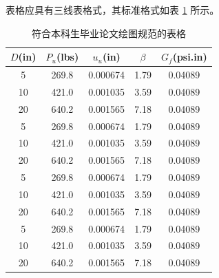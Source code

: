 表格应具有三线表格式，其标准格式如表 \ref{tab:table1} 所示。
\begin{table}[htbp]
\caption{符合本科生毕业论文绘图规范的表格}\label{tab:table1}
\vspace{0.5em}\centering\wuhao
\begin{tabular}{ccccc}
\toprule[1.5pt]
$D$(in) & $P_u$(lbs) & $u_u$(in) & $\beta$ & $G_f$(psi.in)\\
\midrule[1pt]
 5 & 269.8 & 0.000674 & 1.79 & 0.04089\\
10 & 421.0 & 0.001035 & 3.59 & 0.04089\\
20 & 640.2 & 0.001565 & 7.18 & 0.04089\\
 5 & 269.8 & 0.000674 & 1.79 & 0.04089\\
10 & 421.0 & 0.001035 & 3.59 & 0.04089\\
20 & 640.2 & 0.001565 & 7.18 & 0.04089\\
 5 & 269.8 & 0.000674 & 1.79 & 0.04089\\
10 & 421.0 & 0.001035 & 3.59 & 0.04089\\
20 & 640.2 & 0.001565 & 7.18 & 0.04089\\
 5 & 269.8 & 0.000674 & 1.79 & 0.04089\\
10 & 421.0 & 0.001035 & 3.59 & 0.04089\\
20 & 640.2 & 0.001565 & 7.18 & 0.04089\\
\bottomrule[1.5pt]
\end{tabular}
\vspace{\baselineskip}
\end{table}
